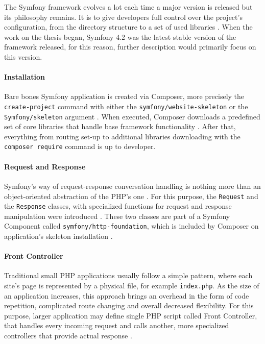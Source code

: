 The Symfony framework evolves a lot each time a major version is released but its philosophy remains. It is to give developers full control over the project's configuration, from the directory structure to a set of used libraries \citep{symfony.reference}. When the work on the thesis began, Symfony 4.2 was the latest stable version of the framework released, for this reason, further description would primarily focus on this version.


\paragraph{Installation}
Bare bones Symfony application is created via Composer, more precisely the \texttt{create-project} command with either the \texttt{symfony/website-skeleton} or the \texttt{Symfony/skeleton} argument \citep{symfony.reference}. When executed, Composer downloads a predefined set of core libraries that handle base framework functionality \citep{symfony.reference}. After that, everything from routing set-up to additional libraries downloading with the \texttt{composer require} command is up to developer.


\paragraph{Request and Response}
Symfony's way of request-response conversation handling is nothing more than an object-oriented abstraction of the PHP's one \citep{symfony.reference}. For this purpose, the \texttt{Request} and the \texttt{Response} classes, with specialized functions for request and response manipulation were introduced \citep{symfony.reference}. These two classes are part of a Symfony Component called \texttt{symfony/http-foundation}, which is included by Composer on application's skeleton installation \citep{symfony.reference}.

\paragraph{Front Controller}
Traditional small PHP applications usually follow a simple pattern, where each site's page is represented by a physical file, for example \texttt{index.php}. As the size of an application increases, this approach brings an overhead in the form of code repetition, complicated route changing and overall decreased flexibility. For this purpose, larger application may define single PHP script called Front Controller, that handles every incoming request and calls another, more specialized controllers that provide actual response \citep{advanced.php}. 

